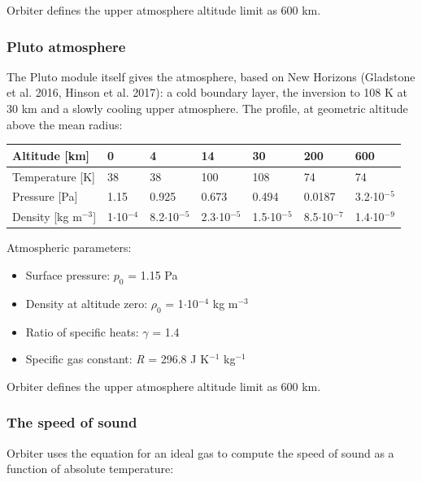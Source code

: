 \documentclass[Orbiter Developer Manual.tex]{subfiles}
\begin{document}
\noindent
Orbiter defines the upper atmosphere altitude limit as 600 km.


\subsubsection{Pluto atmosphere}
The Pluto module itself gives the atmosphere, based on New Horizons (Gladstone et al. 2016, Hinson et al. 2017): a cold boundary layer, the inversion to 108 K at 30 km and a slowly cooling upper atmosphere. The profile, at geometric altitude above the mean radius:

	\begin{longtable}{ |p{}|p{}|p{}|p{}|p{}|p{}|p{}| }
	\hline\rule{0pt}{2ex}
	Altitude [km] & 0 & 4 & 14 & 30 & 200 & 600\\
	\hline\rule{0pt}{2ex}
	Temperature [K] & 38 & 38 & 100 & 108 & 74 & 74\\
	\hline\rule{0pt}{2ex}
	Pressure [Pa] & 1.15 & 0.925 & 0.673 & 0.494 & 0.0187 & 3.2$\cdot$10$^{-5}$\\
	\hline\rule{0pt}{2ex}
	Density [kg m$^{-3}$] & 1$\cdot$10$^{-4}$ & 8.2$\cdot$10$^{-5}$ & 2.3$\cdot$10$^{-5}$ & 1.5$\cdot$10$^{-5}$ & 8.5$\cdot$10$^{-7}$ & 1.4$\cdot$10$^{-9}$\\
	\hline
	\end{longtable}

\noindent
Atmospheric parameters:

\begin{itemize}
\item Surface pressure: $p_{0}$ = 1.15 Pa
\item Density at altitude zero: $\rho_{0}$ = 1$\cdot$10$^{-4}$ kg m$^{-3}$
\item Ratio of specific heats: $\gamma$ = 1.4
\item Specific gas constant: \textit{R} = 296.8 J K$^{-1}$ kg$^{-1}$
\end{itemize}

\noindent
Orbiter defines the upper atmosphere altitude limit as 600 km.


\subsubsection{The speed of sound}
Orbiter uses the equation for an ideal gas to compute the speed of sound as a function of absolute temperature:
\end{document}
